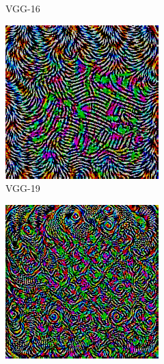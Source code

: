 \begin{figure}[ht!]
\begin{subfigure}{0.16\linewidth}
        \caption{VGG-16}
    \end{subfigure}\hfill%
    \begin{subfigure}{0.16\linewidth}
        \centering
        \includegraphics[height=1\linewidth]{01-images/05-resultate/uap_paper/uap-paper-vgg19.png}
        \caption{VGG-19}
    \end{subfigure}\hfill%
    \begin{subfigure}{0.16\linewidth}
        \centering
        \includegraphics[height=1\linewidth]{01-images/05-resultate/uap_paper/uap-paper-googlenet.png}

\end{subfigure}
\end{figure}
